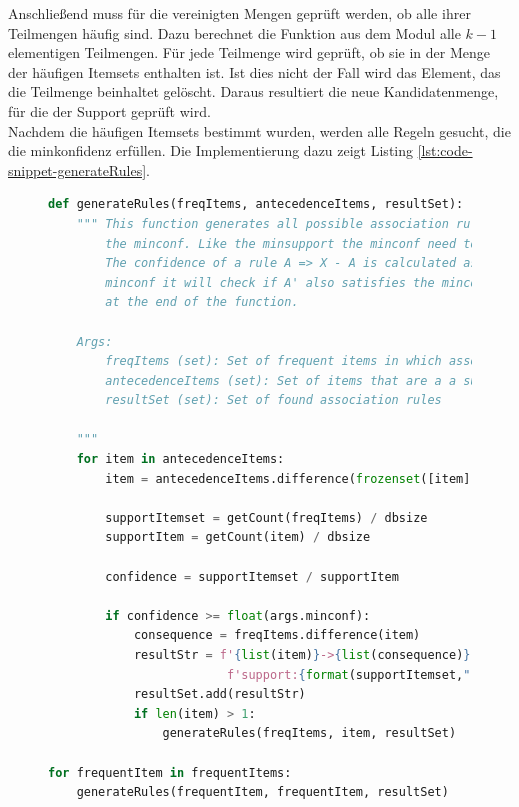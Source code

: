 Anschließend muss für die vereinigten Mengen geprüft werden, ob alle ihrer Teilmengen häufig sind. Dazu berechnet die Funktion  aus dem Modul  alle $k-1$ elementigen Teilmengen. Für jede Teilmenge wird geprüft, ob sie in der Menge der häufigen Itemsets enthalten ist. Ist dies nicht der Fall wird das Element, das die Teilmenge beinhaltet gelöscht. Daraus resultiert die neue Kandidatenmenge, für die der Support geprüft wird.\\
Nachdem die häufigen Itemsets bestimmt wurden, werden alle Regeln gesucht, die die minkonfidenz erfüllen. Die Implementierung dazu zeigt Listing \ref{lst:code-snippet-generateRules}.\\
\begin{figure}[htb]
%
	\begin{lstlisting}[language=python,xleftmargin=2.5em,frame=single,framexleftmargin=2.2em, basicstyle=\scriptsize, caption=generateRules aus associationRuleMiner.py,captionpos=b,label=lst:code-snippet-generateRules]
def generateRules(freqItems, antecedenceItems, resultSet):
    """ This function generates all possible association rules that can be found in the frequent itemsets that satisfy
        the minconf. Like the minsupport the minconf need to be passed by the command line using -minconf=[value].
        The confidence of a rule A => X - A is calculated as support(X) / support(A). If this rule satisfies the
        minconf it will check if A' also satisfies the minconf where A' is a subset of A. This is done recursively
        at the end of the function.

    Args:
        freqItems (set): Set of frequent items in which association rules should be found
        antecedenceItems (set): Set of items that are a a subset of the itemset of the left side of an association rule
        resultSet (set): Set of found association rules

    """
    for item in antecedenceItems:
        item = antecedenceItems.difference(frozenset([item]))

        supportItemset = getCount(freqItems) / dbsize
        supportItem = getCount(item) / dbsize

        confidence = supportItemset / supportItem

        if confidence >= float(args.minconf):
            consequence = freqItems.difference(item)
            resultStr = f'{list(item)}->{list(consequence)},' \
                         f'support:{format(supportItemset,".4f")},confidence:{format(confidence,".4f")}'
            resultSet.add(resultStr)
            if len(item) > 1:
                generateRules(freqItems, item, resultSet)

for frequentItem in frequentItems:
	generateRules(frequentItem, frequentItem, resultSet)
	\end{lstlisting}
\end{figure}\\
